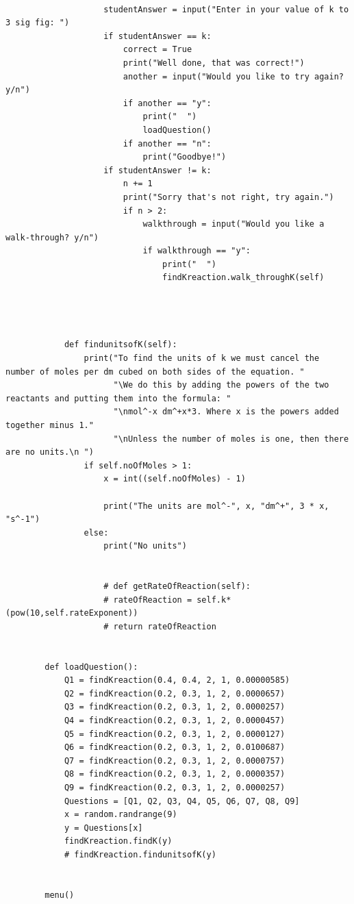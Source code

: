 \documentclass[a4paper,12pt]{report}
\begin{document}
\begin{verbatim}
        
                    studentAnswer = input("Enter in your value of k to 3 sig fig: ")
                    if studentAnswer == k:
                        correct = True
                        print("Well done, that was correct!")
                        another = input("Would you like to try again? y/n")
                        if another == "y":
                            print("  ")
                            loadQuestion()
                        if another == "n":
                            print("Goodbye!")
                    if studentAnswer != k:
                        n += 1
                        print("Sorry that's not right, try again.")
                        if n > 2:
                            walkthrough = input("Would you like a walk-through? y/n")
                            if walkthrough == "y":
                                print("  ")
                                findKreaction.walk_throughK(self)
                        
                            
        
        
            def findunitsofK(self):
                print("To find the units of k we must cancel the number of moles per dm cubed on both sides of the equation. "
                      "\We do this by adding the powers of the two reactants and putting them into the formula: "
                      "\nmol^-x dm^+x*3. Where x is the powers added together minus 1."
                      "\nUnless the number of moles is one, then there are no units.\n ")
                if self.noOfMoles > 1:
                    x = int((self.noOfMoles) - 1)
        
                    print("The units are mol^-", x, "dm^+", 3 * x, "s^-1")
                else:
                    print("No units")
        
        
                    # def getRateOfReaction(self):
                    # rateOfReaction = self.k*(pow(10,self.rateExponent))
                    # return rateOfReaction
        
        
        def loadQuestion():
            Q1 = findKreaction(0.4, 0.4, 2, 1, 0.00000585)
            Q2 = findKreaction(0.2, 0.3, 1, 2, 0.0000657)
            Q3 = findKreaction(0.2, 0.3, 1, 2, 0.0000257)
            Q4 = findKreaction(0.2, 0.3, 1, 2, 0.0000457)
            Q5 = findKreaction(0.2, 0.3, 1, 2, 0.0000127)
            Q6 = findKreaction(0.2, 0.3, 1, 2, 0.0100687)
            Q7 = findKreaction(0.2, 0.3, 1, 2, 0.0000757)
            Q8 = findKreaction(0.2, 0.3, 1, 2, 0.0000357)
            Q9 = findKreaction(0.2, 0.3, 1, 2, 0.0000257)
            Questions = [Q1, Q2, Q3, Q4, Q5, Q6, Q7, Q8, Q9]
            x = random.randrange(9)
            y = Questions[x]
            findKreaction.findK(y)
            # findKreaction.findunitsofK(y)
        
        
        menu()
\end{verbatim}
\end{document}
